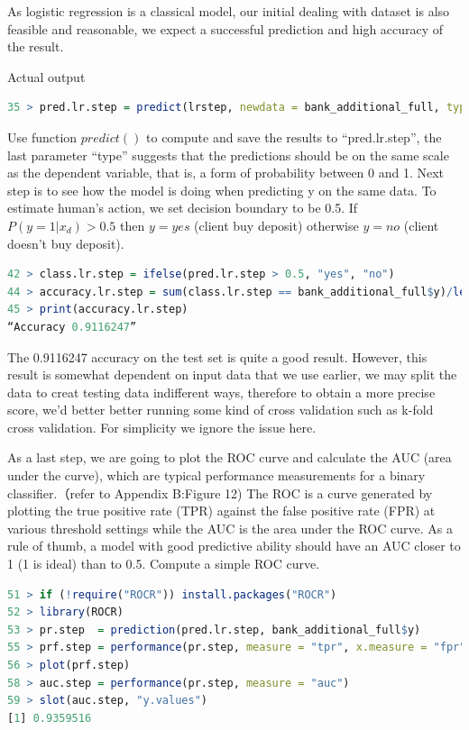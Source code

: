 \documentclass[12pt, a4paper, bibliography=totoc, english]{scrartcl}
\begin{document}
As logistic regression is a classical model, our initial dealing with dataset is also feasible and reasonable, we expect a successful prediction and high accuracy of the result. 

\textbullet\quad Actual output

\begin{lstlisting}[language = R]
35 > pred.lr.step = predict(lrstep, newdata = bank_additional_full, type = "response")
\end{lstlisting}

Use function $predict( )$ to compute and save the results to “pred.lr.step”, the last parameter “type” suggests that the predictions should be on the same scale as the dependent variable, that is, a form of probability between 0 and 1. Next step is to see how the model is doing when predicting y on the same data. To estimate human’s action, we set decision boundary to be 0.5. If $P(y=1|x_d) > 0.5$ then $y = yes$ (client buy deposit) otherwise $y=no$ (client doesn’t buy deposit).

\begin{lstlisting}[language = R]
42 > class.lr.step = ifelse(pred.lr.step > 0.5, "yes", "no")  
44 > accuracy.lr.step = sum(class.lr.step == bank_additional_full$y)/length(class.lr.step) 
45 > print(accuracy.lr.step) 
“Accuracy 0.9116247”
\end{lstlisting}

The 0.9116247 accuracy on the test set is quite a good result. However, this result is somewhat dependent on input data that we use earlier, we may split the data to creat testing data indifferent ways, therefore to obtain a more precise score, we’d better better running some kind of cross validation such as k-fold cross validation. For simplicity we ignore the issue here.

As a last step, we are going to plot the ROC curve and calculate the AUC (area under the curve), which are typical performance measurements for a binary classifier.（refer to Appendix B:Figure 12)
The ROC is a curve generated by plotting the true positive rate (TPR) against the false positive rate (FPR) at various threshold settings while the AUC is the area under the ROC curve. As a rule of thumb, a model with good predictive ability should have an AUC closer to 1 (1 is ideal) than to 0.5. Compute a simple ROC curve.

\begin{lstlisting}[language = R]
51 > if (!require("ROCR")) install.packages("ROCR")
52 > library(ROCR)
53 > pr.step  = prediction(pred.lr.step, bank_additional_full$y)
55 > prf.step = performance(pr.step, measure = "tpr", x.measure = "fpr")  
56 > plot(prf.step)  
58 > auc.step = performance(pr.step, measure = "auc")
59 > slot(auc.step, "y.values")
[1] 0.9359516
\end{lstlisting}
\end{document}
